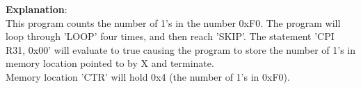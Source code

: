 \documentclass{article}
\begin{document}
\begin{enumerate}
        \textbf{Explanation}:\\
        This program counts the number of 1's in the number 0xF0.  The program will loop through 'LOOP' four times, and then reach 'SKIP'.  The statement 'CPI R31, 0x00' will evaluate to true causing the program to store the number of 1's in memory location pointed to by X and terminate.\\
        Memory location 'CTR' will hold 0x4 (the number of 1's in 0xF0).\\

  \end{enumerate}
\end{document}
